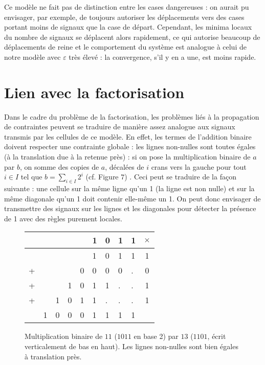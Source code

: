 \documentclass[11pt, openany]{article}
\begin{document}
Ce modèle ne fait pas de distinction entre les cases dangereuses : on aurait pu envisager, par exemple, de toujours autoriser les déplacements vers des cases portant moins de signaux que la case de départ. Cependant, les minima locaux du nombre de signaux se déplacent alors rapidement, ce qui autorise beaucoup de déplacements de reine et le comportement du système est analogue à celui de notre modèle avec $\varepsilon$ très élevé : la convergence, s'il y en a une, est moins rapide. 


\section*{Lien avec la factorisation}

Dans le cadre du problème de la factorisation, les problèmes liés à la propagation de contraintes peuvent se traduire de manière assez analogue aux signaux transmis par les cellules de ce modèle. En effet, les termes de l'addition binaire doivent respecter une contrainte globale : les lignes non-nulles sont toutes égales (à la translation due à la retenue près) : si on pose la multiplication binaire de $a$ par $b$, on somme des copies de $a$, décalées de $i$ crans vers la gauche pour tout $i\in I$ tel que $b = \sum_{i\in I}2^i$ (cf. Figure $7$) . Ceci peut se traduire de la façon suivante : une cellule sur la même ligne qu'un 1 (la ligne est non nulle) et sur la même diagonale qu'un 1 doit contenir elle-même un 1. On peut donc envisager de transmettre des signaux sur les lignes et les diagonales pour détecter la présence de 1 avec des règles purement locales. 

\begin{figure}
\centering
\begin{tabular}{lllllllll|c}
&&&&&1&0&1&1&$\times$\\
\hline
&&&&&1&0&1&1&1\\
+&&&&0&0&0&0&.&0 \\
+&&&1&0&1&1&.&.&1\\
+&&1&0&1&1&.&.&.&1\\
\hline
&1&0&0&0&1&1&1&1&\\
\end{tabular}
\caption{Multiplication binaire de $11$ ($1011$ en base 2) par $13$ ($1101$, écrit verticalement de bas en haut). Les lignes non-nulles sont bien égales à translation près.}
\end{figure}
\end{document}
